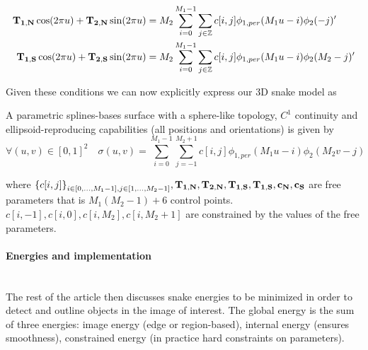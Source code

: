 \documentclass[a4paper, 11pt]{article}
\begin{document}
\begin{align*}
   {\bf T_{1, N}} \cos (2\pi u) + {\bf T_{2, N}} \sin (2\pi u) &= M_2\sum_{i=0}^{M_1-1} \sum_{j \in \mathbb{Z}} c[i,j] 
   \phi_{1, per} (M_1u-i)\phi_2(-j)' \\
   {\bf T_{1, S}} \cos (2\pi u) + {\bf T_{2, S}} \sin (2\pi u) &= M_2\sum_{i=0}^{M_1-1} \sum_{j \in \mathbb{Z}} c[i,j] 
   \phi_{1, per} (M_1u-i)\phi_2(M_2-j)' 
 \end{align*}

Given these conditions we can now explicitly express our 3D snake model as

\begin{thm}{2}
  A parametric splines-bases surface with a sphere-like topology, $C^1$ continuity and ellipsoid-reproducing 
  capabilities (all positions and orientations) is given by
  \begin{equation}
    \forall (u, v) \in {[0,1]}^2 \quad \sigma(u,v) = \sum_{i=0}^{M_1-1} \sum_{j=-1}^{M_2+1} c[i,j] \phi_{1, per} 
    (M_1u-i)\phi_2(M_2v-j)
  \end{equation}
  
  where ${\{c[i,j]\}}_{i \in [0, \ldots, M_1-1], j \in [1, \ldots, M_2-1]}, {\bf T_{1, N}}, {\bf T_{2, N}}, {\bf T_{1, 
  S}} , {\bf T_{1, S}}, {\bf c_{N}}, {\bf c_{S}}$ are free parameters that is $M_1(M_2-1) + 6$ control points. $c[i,-1], 
  c[i, 0], c[i, M_2], c[i, M_2+1]$ are constrained by the values of the free parameters.
\end{thm}

\paragraph{Energies and implementation} \mbox{} \\

The rest of the article then discusses snake energies to be minimized in order to detect and outline objects in the 
image of interest. The global energy is the sum of three energies: image energy (edge or region-based), internal energy 
(ensures smoothness), constrained energy (in practice hard constraints on parameters). 
\end{document}
